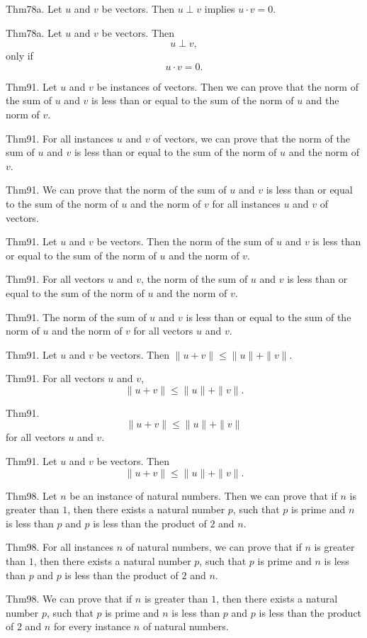 \documentclass{article}
\begin{document}
Thm78a. Let $u$ and $v$ be vectors. Then $u \perp v$ implies $u \cdot v = 0$.

Thm78a. Let $u$ and $v$ be vectors. Then $$u \perp v,$$ only if $$u \cdot v = 0.$$

Thm91. Let $u$ and $v$ be instances of vectors. Then we can prove that the norm of the sum of $u$ and $v$ is less than or equal to the sum of the norm of $u$ and the norm of $v$.

Thm91. For all instances $u$ and $v$ of vectors, we can prove that the norm of the sum of $u$ and $v$ is less than or equal to the sum of the norm of $u$ and the norm of $v$.

Thm91. We can prove that the norm of the sum of $u$ and $v$ is less than or equal to the sum of the norm of $u$ and the norm of $v$ for all instances $u$ and $v$ of vectors.

Thm91. Let $u$ and $v$ be vectors. Then the norm of the sum of $u$ and $v$ is less than or equal to the sum of the norm of $u$ and the norm of $v$.

Thm91. For all vectors $u$ and $v$, the norm of the sum of $u$ and $v$ is less than or equal to the sum of the norm of $u$ and the norm of $v$.

Thm91. The norm of the sum of $u$ and $v$ is less than or equal to the sum of the norm of $u$ and the norm of $v$ for all vectors $u$ and $v$.

Thm91. Let $u$ and $v$ be vectors. Then $\| u + v \| \leq \| u \| + \| v \|$.

Thm91. For all vectors $u$ and $v$, $$\| u + v \| \leq \| u \| + \| v \|.$$

Thm91. $$\| u + v \| \leq \| u \| + \| v \|$$ for all vectors $u$ and $v$.

Thm91. Let $u$ and $v$ be vectors. Then $$\| u + v \| \leq \| u \| + \| v \|.$$

Thm98. Let $n$ be an instance of natural numbers. Then we can prove that if $n$ is greater than $1$, then there exists a natural number $p$, such that $p$ is prime and $n$ is less than $p$ and $p$ is less than the product of $2$ and $n$.

Thm98. For all instances $n$ of natural numbers, we can prove that if $n$ is greater than $1$, then there exists a natural number $p$, such that $p$ is prime and $n$ is less than $p$ and $p$ is less than the product of $2$ and $n$.

Thm98. We can prove that if $n$ is greater than $1$, then there exists a natural number $p$, such that $p$ is prime and $n$ is less than $p$ and $p$ is less than the product of $2$ and $n$ for every instance $n$ of natural numbers.
\end{document}
